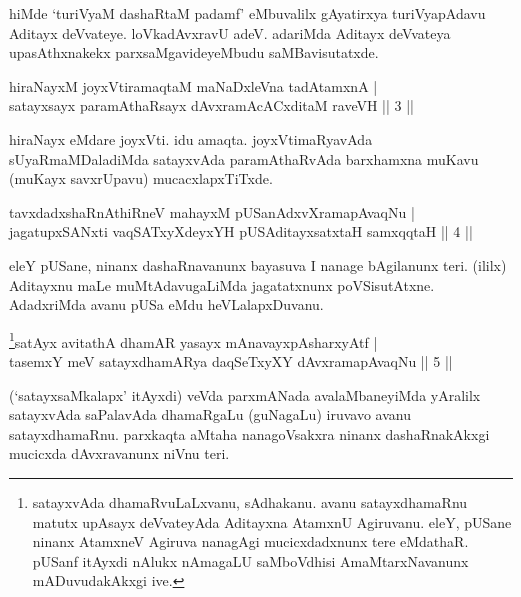 \begin{artha} 
hiMde `turiVyaM dashaRtaM padamf' eMbuvalilx gAyatirxya turiVyapAdavu 
Aditayx deVvateye. loVkadAvxravU adeV. adariMda Aditayx deVvateya 
upasAthxnakekx parxsaMgavideyeMbudu saMBavisutatxde.
\end{artha}


\begin{shl}
hiraNayxM joyxVtiramaqtaM maNaDxleVna tadAtamxnA | \\
satayxsayx paramAthaRsayx dAvxramAcACxditaM raveVH \hfill||  3 || 
\end{shl}

\begin{artha} 
hiraNayx eMdare joyxVti. idu amaqta. joyxVtimaRyavAda 
sUyaRmaMDaladiMda satayxvAda paramAthaRvAda barxhamxna muKavu (muKayx 
savxrUpavu) mucacxlapxTiTxde.
\end{artha}


\begin{shl}
tavxdadxshaRnAthiRneV mahayxM pUSanAdxvXramapAvaqNu | \\
jagatupxSANxti vaqSATxyXdeyxYH pUSA\s \s ditayxsatxtaH samxqqtaH \hfill||  4 || 
\end{shl}

\begin{artha} 
eleY pUSane, ninanx dashaRnavanunx bayasuva I nanage bAgilanunx teri. 
(ililx) Aditayxnu maLe muMtAdavugaLiMda jagatatxnunx poVSisutAtxne. 
AdadxriMda avanu pUSa eMdu heVLalapxDuvanu.
\end{artha}


\begin{shl}
\footnote{satayxvAda dhamaRvuLaLxvanu, sAdhakanu. avanu 
satayxdhamaRnu matutx upAsayx deVvateyAda Aditayxna AtamxnU Agiruvanu. 
eleY, pUSane ninanx AtamxneV Agiruva nanagAgi mucicxdadxnunx tere 
eMdathaR. pUSanf itAyxdi nAlukx nAmagaLU saMboVdhisi AmaMtarxNavanunx 
mADuvudakAkxgi ive.}satAyx avitathA dhamAR yasayx mAnavayxpAsharxyAtf | \\
tasemxY meV satayxdhamARya daqSeTxyXY dAvxramapAvaqNu \hfill||  5 || 
\end{shl}

\begin{artha} 
(`satayxsaMkalapx' itAyxdi) veVda parxmANada avalaMbaneyiMda yAralilx 
satayxvAda saPalavAda dhamaRgaLu (guNagaLu) iruvavo avanu 
satayxdhamaRnu. parxkaqta aMtaha nanagoVsakxra ninanx dashaRnakAkxgi 
mucicxda dAvxravanunx niVnu teri.
\end{artha}

